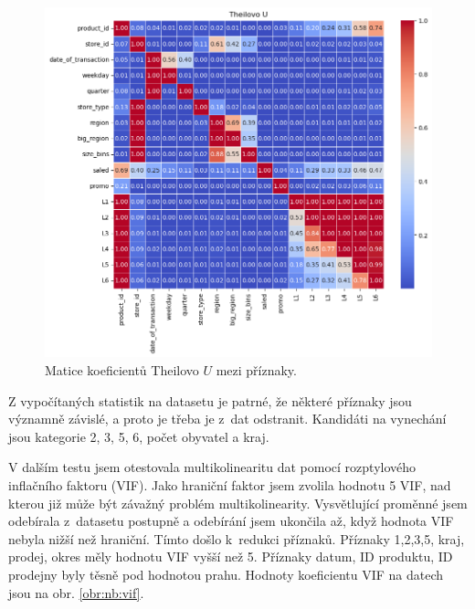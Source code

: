\begin{figure}[h!]
    \centering
    \includegraphics[width=\textwidth]{obrazky/pripravadat/theils_u-002.png}
    \caption{Matice koeficientů Theilovo $U$ mezi příznaky.}
    \label{obr:nb:thiels}
\end{figure}

Z vypočítaných statistik na datasetu je patrné, že některé příznaky jsou významně závislé, a proto je třeba je z~dat odstranit. Kandidáti na vynechání jsou kategorie 2, 3, 5, 6, počet obyvatel a kraj. 

V dalším testu jsem otestovala multikolinearitu dat pomocí rozptylového inflačního faktoru (VIF). Jako hraniční faktor jsem zvolila hodnotu 5 VIF, nad kterou již může být závažný problém multikolinearity.\cite{bib:MB}
Vysvětlující proměnné jsem odebírala z~datasetu postupně a odebírání jsem ukončila až, když hodnota VIF nebyla nižší než hraniční.
Tímto došlo k~redukci příznaků. Příznaky 1,2,3,5, kraj, prodej, okres měly hodnotu VIF vyšší než 5. Příznaky datum, ID produktu, ID prodejny byly těsně pod hodnotou prahu.
Hodnoty koeficientu VIF na datech jsou na obr. \ref*{obr:nb:vif}. 

